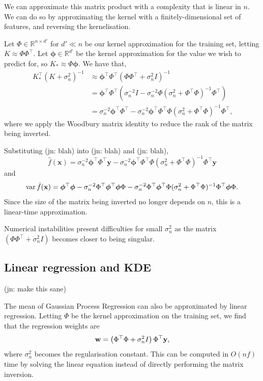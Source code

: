 \documentclass[11pt,twoside,openright]{report}
\newcommand\bphi{\bm{\phi}}
\newcommand\bbR{\mathbb{R}}
\newcommand\bw{\mathbf{w}}
\newcommand\bx{\mathbf{x}}
\newcommand\by{\mathbf{y}}
\DeclareMathOperator{\var}{var}
\newcommand\jn[1]{{\color{red}(jn: #1)}}
\begin{document}
We can approximate this matrix product with a complexity that is linear in $n$. We can do so by approximating the kernel with a finitely-dimensional set of features, and reversing the kernelisation.

Let $\Phi \in \bbR^{n \times d'}$ for $d' \ll n$ be our kernel approximation for the training set, letting $K \approx \Phi \Phi^\top$. Let $\bphi \in \bbR^{d'}$ be the kernel approximation for the value we wish to predict for, so $K_* \approx \Phi \bphi$. We have that,\begin{align*}
    K_*^\top(K+\sigma_n^2)^{-1} &\approx \bphi^\top\Phi^\top  \left(\Phi \Phi^\top + \sigma_n^2I\right)^{-1} \\
    &= \bphi^\top\Phi^\top  \left( \sigma_n^{-2}I - \sigma_n^{-2}\Phi(\sigma_n^{2} + \Phi^\top\Phi)^{-1}\Phi^\top\right) \\
    &=  \sigma_n^{-2}\bphi^\top\Phi^\top - \sigma_n^{-2}\bphi^\top\Phi^\top \Phi(\sigma_n^{2} + \Phi^\top\Phi)^{-1}\Phi^\top \text{,}
\end{align*} where we apply the Woodbury matrix identity to reduce the rank of the matrix being inverted.

Substituting \jn{blah} into \jn{blah} and \jn{blah}, \[
    \hat f(\bx) = \sigma_n^{-2} \bphi^\top\Phi^\top\by - \sigma_n^{-2} \bphi^\top\Phi^\top\Phi(\sigma_n^{2} + \Phi^\top\Phi)^{-1}\Phi^\top\by
\] and \[
    \var \hat f(\bx) = \bphi^\top\bphi - \sigma_n^{-2}\Phi^\top \bphi^\top\bphi\Phi - \sigma_n^{-2}\Phi^\top \bphi^\top\Phi(\sigma_n^{2} + \Phi^\top\Phi)^{-1}\Phi^\top\bphi\Phi\text.
\]Since the size of the matrix being inverted no longer depends on $n$, this is a linear-time approximation.

Numerical instabilities present difficulties for small $\sigma_n^2$ as the matrix $(\Phi\Phi^\top + \sigma_n^2I)$ becomes closer to being singular.

\subsection{Linear regression and KDE}

\jn{make this sane}

The mean of Gaussian Process Regression can also be approximated by linear regression. Letting $\Phi$ be the kernel approximation on the training set, we find that the regression weights are\[
    \bw = \left(\Phi^\top\Phi + \sigma_n^2 I\right) \Phi^\top\by\text,
\] where $\sigma_n^2$ becomes the regularisation constant. This can be computed in $O(nf)$ time by solving the linear equation instead of directly performing the matrix inversion.
\end{document}
